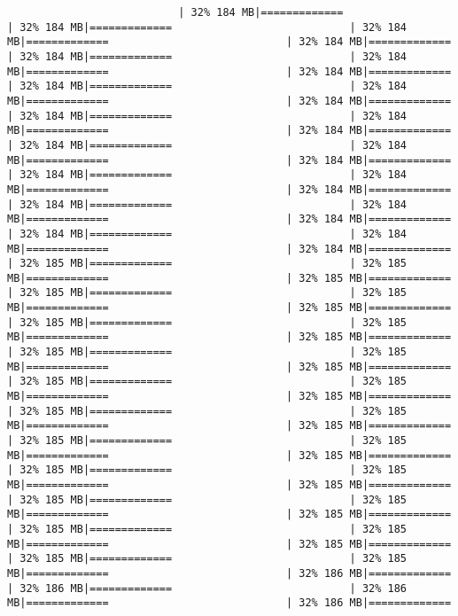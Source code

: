 \documentclass[
]{article}
\begin{document}
\begin{verbatim}
                           | 32% 184 MB|=============                            | 32% 184 MB|=============                            | 32% 184 MB|=============                            | 32% 184 MB|=============                            | 32% 184 MB|=============                            | 32% 184 MB|=============                            | 32% 184 MB|=============                            | 32% 184 MB|=============                            | 32% 184 MB|=============                            | 32% 184 MB|=============                            | 32% 184 MB|=============                            | 32% 184 MB|=============                            | 32% 184 MB|=============                            | 32% 184 MB|=============                            | 32% 184 MB|=============                            | 32% 184 MB|=============                            | 32% 184 MB|=============                            | 32% 184 MB|=============                            | 32% 184 MB|=============                            | 32% 184 MB|=============                            | 32% 184 MB|=============                            | 32% 184 MB|=============                            | 32% 184 MB|=============                            | 32% 184 MB|=============                            | 32% 184 MB|=============                            | 32% 185 MB|=============                            | 32% 185 MB|=============                            | 32% 185 MB|=============                            | 32% 185 MB|=============                            | 32% 185 MB|=============                            | 32% 185 MB|=============                            | 32% 185 MB|=============                            | 32% 185 MB|=============                            | 32% 185 MB|=============                            | 32% 185 MB|=============                            | 32% 185 MB|=============                            | 32% 185 MB|=============                            | 32% 185 MB|=============                            | 32% 185 MB|=============                            | 32% 185 MB|=============                            | 32% 185 MB|=============                            | 32% 185 MB|=============                            | 32% 185 MB|=============                            | 32% 185 MB|=============                            | 32% 185 MB|=============                            | 32% 185 MB|=============                            | 32% 185 MB|=============                            | 32% 185 MB|=============                            | 32% 185 MB|=============                            | 32% 185 MB|=============                            | 32% 185 MB|=============                            | 32% 185 MB|=============                            | 32% 185 MB|=============                            | 32% 185 MB|=============                            | 32% 185 MB|=============                            | 32% 185 MB|=============                            | 32% 185 MB|=============                            | 32% 186 MB|=============                            | 32% 186 MB|=============                            | 32% 186 MB|=============                            | 32% 186 MB|=============                          
\end{verbatim}
\end{document}
